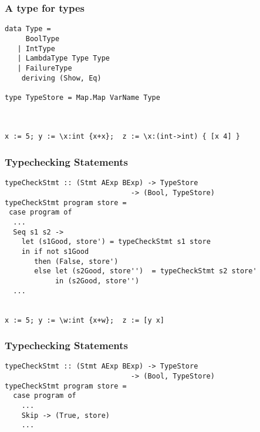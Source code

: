 \documentclass{beamer}
\begin{document}
\begin{frame}[fragile]
\frametitle{A type for types}
\begin{verbatim}
data Type =
     BoolType
   | IntType
   | LambdaType Type Type
   | FailureType 
    deriving (Show, Eq)

type TypeStore = Map.Map VarName Type



x := 5; y := \x:int {x+x};  z := \x:(int->int) { [x 4] }
\end{verbatim}

\end{frame}


\begin{frame}[fragile]
\frametitle{Typechecking Statements}
\begin{verbatim}
typeCheckStmt :: (Stmt AExp BExp) -> TypeStore 
                              -> (Bool, TypeStore)
typeCheckStmt program store =
 case program of
  ...
  Seq s1 s2 ->
    let (s1Good, store') = typeCheckStmt s1 store
    in if not s1Good
       then (False, store')
       else let (s2Good, store'')  = typeCheckStmt s2 store'
            in (s2Good, store'')
  ...


x := 5; y := \w:int {x+w};  z := [y x]
\end{verbatim}
\end{frame}

\begin{frame}[fragile]
\frametitle{Typechecking Statements}
\begin{verbatim}
typeCheckStmt :: (Stmt AExp BExp) -> TypeStore 
                              -> (Bool, TypeStore)
typeCheckStmt program store =
  case program of
    ...
    Skip -> (True, store)
    ...
\end{verbatim}
\end{frame}
\end{document}
